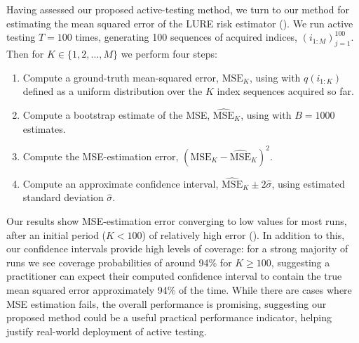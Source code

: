 Having assessed our proposed active-testing method, we turn to our method for estimating the mean squared error of the LURE risk estimator ().
We run active testing $T=100$ times, generating 100 sequences of acquired indices, $(i_{1:M})_{j=1}^{100}$.
Then for $K \in \{1, 2, \ldots, M\}$ we perform four steps:

\begin{enumerate}
    \item Compute a ground-truth mean-squared error, $\mathrm{MSE}_K$, using  with $q(i_{1:K})$ defined as a uniform distribution over the $K$ index sequences acquired so far.
    \item Compute a bootstrap estimate of the MSE, $\widehat{\mathrm{MSE}}_K$, using  with $B=1000$ estimates.
    \item Compute the MSE-estimation error, $(\mathrm{MSE}_K - \widehat{\mathrm{MSE}}_K)^2$.
    \item Compute an approximate confidence interval, $\widehat{\mathrm{MSE}}_K \pm 2 \hat{\sigma}$, using estimated standard deviation $\hat{\sigma}$.
\end{enumerate}

Our results show MSE-estimation error converging to low values for most runs, after an initial period ($K<100$) of relatively high error ().
In addition to this, our confidence intervals provide high levels of coverage: for a strong majority of runs we see coverage probabilities of around 94\% for $K\geq 100$, suggesting a practitioner can expect their computed confidence interval to contain the true mean squared error approximately 94\% of the time.
While there are cases where MSE estimation fails, the overall performance is promising, suggesting our proposed method could be a useful practical performance indicator, helping justify real-world deployment of active testing.